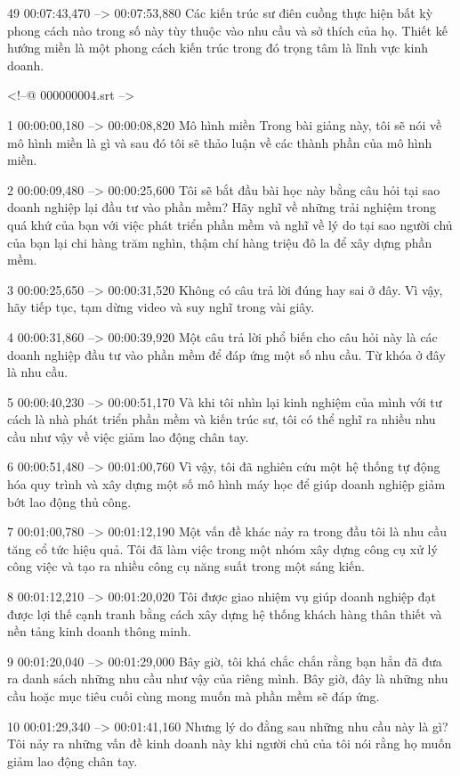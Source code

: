 49
00:07:43,470 --> 00:07:53,880
Các kiến ​​trúc sư điên cuồng thực hiện bất kỳ phong cách nào trong số này tùy thuộc vào nhu cầu và sở thích của họ.  Thiết kế hướng miền là một phong cách kiến ​​trúc trong đó trọng tâm là lĩnh vực kinh doanh.

<!--@ 000000004.srt -->

1
00:00:00,180 --> 00:00:08,820
Mô hình miền Trong bài giảng này, tôi sẽ nói về mô hình miền là gì và sau đó tôi sẽ thảo luận về các thành phần của mô hình miền.

2
00:00:09,480 --> 00:00:25,600
Tôi sẽ bắt đầu bài học này bằng câu hỏi tại sao doanh nghiệp lại đầu tư vào phần mềm?  Hãy nghĩ về những trải nghiệm trong quá khứ của bạn với việc phát triển phần mềm và nghĩ về lý do tại sao người chủ của bạn lại chi hàng trăm nghìn, thậm chí hàng triệu đô la để xây dựng phần mềm.

3
00:00:25,650 --> 00:00:31,520
Không có câu trả lời đúng hay sai ở đây.  Vì vậy, hãy tiếp tục, tạm dừng video và suy nghĩ trong vài giây.

4
00:00:31,860 --> 00:00:39,920
Một câu trả lời phổ biến cho câu hỏi này là các doanh nghiệp đầu tư vào phần mềm để đáp ứng một số nhu cầu.  Từ khóa ở đây là nhu cầu.

5
00:00:40,230 --> 00:00:51,170
Và khi tôi nhìn lại kinh nghiệm của mình với tư cách là nhà phát triển phần mềm và kiến ​​trúc sư, tôi có thể nghĩ ra nhiều nhu cầu như vậy về việc giảm lao động chân tay.

6
00:00:51,480 --> 00:01:00,760
Vì vậy, tôi đã nghiên cứu một hệ thống tự động hóa quy trình và xây dựng một số mô hình máy học để giúp doanh nghiệp giảm bớt lao động thủ công.

7
00:01:00,780 --> 00:01:12,190
Một vấn đề khác nảy ra trong đầu tôi là nhu cầu tăng cổ tức hiệu quả.  Tôi đã làm việc trong một nhóm xây dựng công cụ xử lý công việc và tạo ra nhiều công cụ năng suất trong một sáng kiến.

8
00:01:12,210 --> 00:01:20,020
Tôi được giao nhiệm vụ giúp doanh nghiệp đạt được lợi thế cạnh tranh bằng cách xây dựng hệ thống khách hàng thân thiết và nền tảng kinh doanh thông minh.

9
00:01:20,040 --> 00:01:29,000
Bây giờ, tôi khá chắc chắn rằng bạn hẳn đã đưa ra danh sách những nhu cầu như vậy của riêng mình.  Bây giờ, đây là những nhu cầu hoặc mục tiêu cuối cùng mong muốn mà phần mềm sẽ đáp ứng.

10
00:01:29,340 --> 00:01:41,160
Nhưng lý do đằng sau những nhu cầu này là gì?  Tôi nảy ra những vấn đề kinh doanh này khi người chủ của tôi nói rằng họ muốn giảm lao động chân tay.

